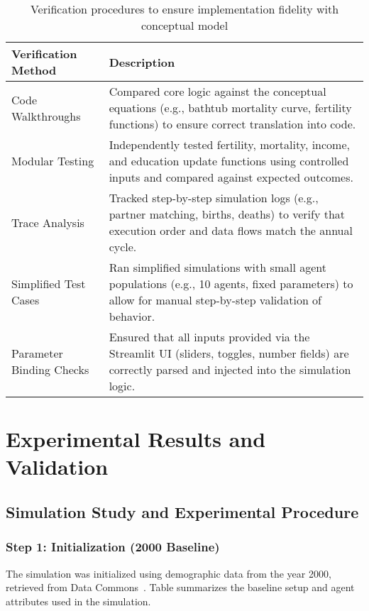 \documentclass[12pt]{article}
\begin{document}
\begin{table}[H]
\centering
\renewcommand{\arraystretch}{1.2}
\begin{tabular}{|>{\raggedright\arraybackslash}p{3.8cm}|p{10.2cm}|}
\hline
\textbf{Verification Method} & \textbf{Description} \\ 
\hline
Code Walkthroughs & Compared core logic against the conceptual equations (e.g., bathtub mortality curve, fertility functions) to ensure correct translation into code. \\ 
\hline
Modular Testing & Independently tested fertility, mortality, income, and education update functions using controlled inputs and compared against expected outcomes. \\ 
\hline
Trace Analysis & Tracked step-by-step simulation logs (e.g., partner matching, births, deaths) to verify that execution order and data flows match the annual cycle. \\ 
\hline
Simplified Test Cases & Ran simplified simulations with small agent populations (e.g., 10 agents, fixed parameters) to allow for manual step-by-step validation of behavior. \\ 
\hline
Parameter Binding Checks & Ensured that all inputs provided via the Streamlit UI (sliders, toggles, number fields) are correctly parsed and injected into the simulation logic. \\ 
\hline
\end{tabular}
\caption{Verification procedures to ensure implementation fidelity with conceptual model}
\label{tab:verification}
\end{table}



\newpage
\section{Experimental Results and Validation}

\subsection{Simulation Study and Experimental Procedure}

\subsubsection*{Step 1: Initialization (2000 Baseline)}

The simulation was initialized using demographic data from the year 2000, retrieved from Data Commons~\cite{datacommons}. Table summarizes the baseline setup and agent attributes used in the simulation.
\end{document}
